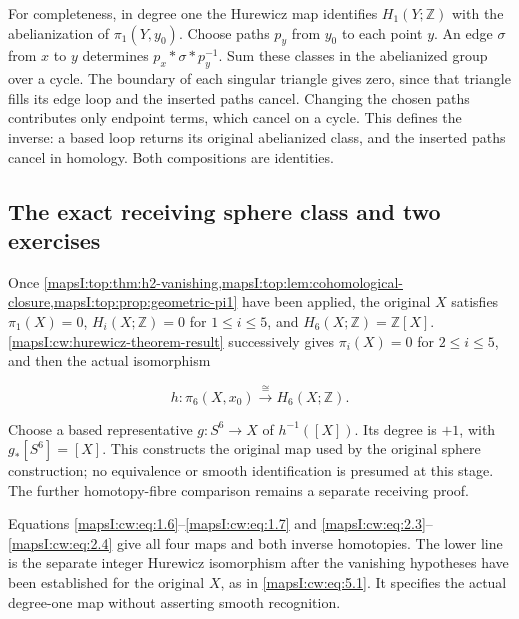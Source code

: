 For completeness, in degree one the Hurewicz map identifies \(H_1(Y;\mathbb Z)\) with the abelianization of \(\pi_1(Y,y_0)\). Choose paths \(p_y\) from \(y_0\) to each point \(y\). An edge \(\sigma\) from \(x\) to \(y\) determines \(p_x*\sigma*p_y^{-1}\). Sum these classes in the abelianized group over a cycle. The boundary of each singular triangle gives zero, since that triangle fills its edge loop and the inserted paths cancel. Changing the chosen paths contributes only endpoint terms, which cancel on a cycle. This defines the inverse: a based loop returns its original abelianized class, and the inserted paths cancel in homology. Both compositions are identities.

\subsection{The exact receiving sphere class and two exercises}
\label{mapsI:cw:cw-hurewicz-exercises}

Once \cref{mapsI:top:thm:h2-vanishing,mapsI:top:lem:cohomological-closure,mapsI:top:prop:geometric-pi1} have been applied, the original \(X\) satisfies
\(\pi_1(X)=0\), \(H_i(X;\mathbb Z)=0\) for \(1\leq i\leq5\), and
\(H_6(X;\mathbb Z)=\mathbb Z[X]\).
\cref{mapsI:cw:hurewicz-theorem-result} successively gives \(\pi_i(X)=0\) for \(2\leq i\leq5\), and then the actual isomorphism

\begin{equation}
h:\pi_6(X,x_0)\xrightarrow{\;\cong\;}H_6(X;\mathbb Z).
\label{mapsI:cw:eq:5.1}
\end{equation}

Choose a based representative \(g:S^6\to X\) of \(h^{-1}([X])\). Its degree is \(+1\), with
\(g_*[S^6]=[X]\). This constructs the original map used by the original sphere construction; no equivalence or smooth identification is presumed at this stage. The further homotopy-fibre comparison remains a separate receiving proof.

Equations \eqref{mapsI:cw:eq:1.6}--\eqref{mapsI:cw:eq:1.7} and \eqref{mapsI:cw:eq:2.3}--\eqref{mapsI:cw:eq:2.4} give all four maps and both inverse homotopies. The lower line is the separate integer Hurewicz isomorphism after the vanishing hypotheses have been established for the original \(X\), as in \eqref{mapsI:cw:eq:5.1}. It specifies the actual degree-one map without asserting smooth recognition.


